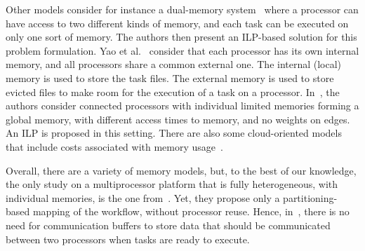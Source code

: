 \documentclass[conference]{IEEEtran}
\begin{document}
Other models consider for instance a 
dual-memory system~\cite{herrmann2014memory} where a processor can have access 
to two different kinds of memory, and each task can be executed on only one sort of memory.
The authors then present an ILP-based solution for this problem formulation.
%
Yao et al.~\cite{yao2022memory} consider that each processor has its own internal memory, and all
processors share a common external one. The internal (local) memory is used to store the task files.
The external memory is used to store evicted files to make room for the execution of a task on a processor.
%
In~\cite{ding2024ils}, the authors consider connected processors with individual limited memories
forming a global memory, with different access times to memory, and no weights on edges. An ILP
is proposed in this setting. 
%
%
There are also some cloud-oriented models that include costs associated with memory usage~\cite{liang2020memory}.

Overall, there are a variety of memory models, but, to the best of our knowledge, the only study on a multiprocessor
platform that is fully heterogeneous, with individual memories, is the one from~\cite{DBLP:conf/icpp/KulaginaMB24}.
Yet, they propose only a partitioning-based mapping of the workflow, without processor reuse.
Hence, in~\cite{DBLP:conf/icpp/KulaginaMB24}, there is no need for communication buffers to store data 
that should be communicated between two processors when tasks are ready to execute. 
\end{document}

